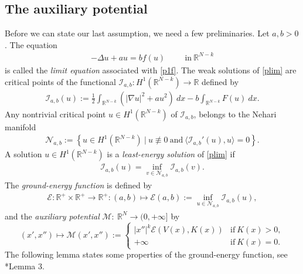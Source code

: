 \documentclass[a4paper]{amsart}
\begin{document}
\subsection{The auxiliary potential}\label{sect:Lambda}
Before we can state our last assumption, we need a few preliminaries. Let $a,b > 0$. The equation
\begin{align}\label{plim}
	 -\Delta u + au = bf(u) \hspace{1cm} \text{in} \ {\mathbb{R}}^{N-k}
\end{align}
is called the \textit{limit equation} associated with \eqref{p1f}. The weak solutions of \eqref{plim} are critical
points of the functional $\mathcal{I}_{a,b} : H^1({\mathbb{R}}^{N-k}) \rightarrow {\mathbb{R}}$ defined by
\begin{align}\label{defIab}
 \mathcal{I}_{a,b}(u) := \frac{1}{2} \int_{{\mathbb{R}}^{N-k}} \left(  {\left| {\nabla u} \right|}^2 + a u^2 \right)\: dx - b \int_{{\mathbb{R}}^{N-k}}
F(u)\: dx.
\end{align}
Any nontrivial critical point  $u \in H^1({\mathbb{R}}^{N-k})$ of $\mathcal{I}_{a,b}$, belongs to
the Nehari manifold
\begin{align*}
 \mathcal{N}_{a,b} := \left\{ u \in H^1({\mathbb{R}}^{N-k}) \ \vert\ u \not\equiv 0\ \text{and}\ \langle \mathcal{I}_{a,b}'(u),u
\rangle = 0 \right\}.
\end{align*}
A solution $u \in H^1({\mathbb{R}}^{N-k})$ is a \textit{least-energy solution} of \eqref{plim} if
\begin{align*}
 \mathcal{I}_{a,b}(u) = \inf_{v \in \mathcal{N}_{a,b}} \mathcal{I}_{a,b}(v).
\end{align*}
The \textit{ground-energy function} is defined by
\begin{align*}
 \mathcal{E} : {\mathbb{R}}^+\times {\mathbb{R}}^+ \rightarrow {\mathbb{R}}^+ : (a,b) \mapsto \mathcal{E}(a,b) := \inf_{u \in \mathcal{N}_{a,b}}
\mathcal{I}_{a,b}(u),
\end{align*}
and the \textit{auxiliary potential} $\mathcal{M} :\ {\mathbb{R}}^{N} \rightarrow (0,+\infty]$ by
\[
 (x',x'') \mapsto \mathcal{M}(x',x'') := \left\{ \begin{array}{ll} {\left| {x''} \right|}^{k} \mathcal{E}\left(V(x),K(x)\right) &
\text{if}\ K(x) > 0, \\
 +\infty & \text{if}\ K(x)=0.
 \end{array} 
 \right.
\]
The following lemma states some properties of the ground-energy function, see \cite{BVS}*{Lemma 3}.
\end{document}
